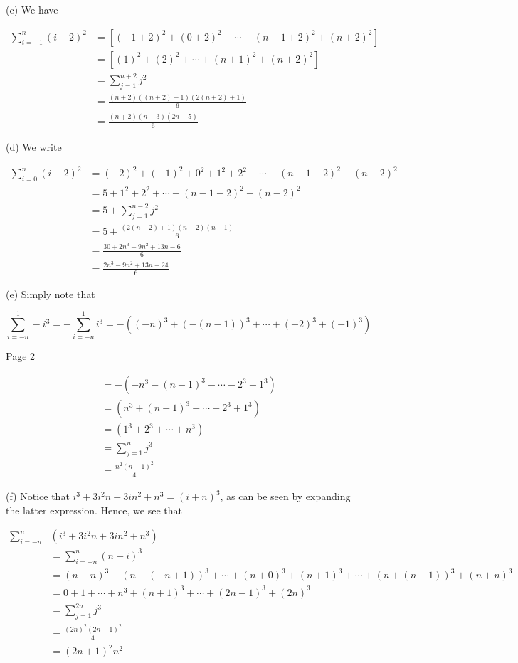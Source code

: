\documentclass[10pt]{article}
\begin{document}
(c) We have

$$
\begin{aligned}
\sum_{i=-1}^{n}(i+2)^{2} & =\left[(-1+2)^{2}+(0+2)^{2}+\cdots+(n-1+2)^{2}+(n+2)^{2}\right] \\
& =\left[(1)^{2}+(2)^{2}+\cdots+(n+1)^{2}+(n+2)^{2}\right] \\
& =\sum_{j=1}^{n+2} j^{2} \\
& =\frac{(n+2)((n+2)+1)(2(n+2)+1)}{6} \\
& =\frac{(n+2)(n+3)(2 n+5)}{6}
\end{aligned}
$$

(d) We write

$$
\begin{aligned}
\sum_{i=0}^{n}(i-2)^{2} & =(-2)^{2}+(-1)^{2}+0^{2}+1^{2}+2^{2}+\cdots+(n-1-2)^{2}+(n-2)^{2} \\
& =5+1^{2}+2^{2}+\cdots+(n-1-2)^{2}+(n-2)^{2} \\
& =5+\sum_{j=1}^{n-2} j^{2} \\
& =5+\frac{(2(n-2)+1)(n-2)(n-1)}{6} \\
& =\frac{30+2 n^{3}-9 n^{2}+13 n-6}{6} \\
& =\frac{2 n^{3}-9 n^{2}+13 n+24}{6}
\end{aligned}
$$

(e) Simply note that

$$
\sum_{i=-n}^{1}-i^{3}=-\sum_{i=-n}^{1} i^{3}=-\left((-n)^{3}+(-(n-1))^{3}+\cdots+(-2)^{3}+(-1)^{3}\right)
$$

Page 2

$$
\begin{aligned}
& =-\left(-n^{3}-(n-1)^{3}-\cdots-2^{3}-1^{3}\right) \\
& =\left(n^{3}+(n-1)^{3}+\cdots+2^{3}+1^{3}\right) \\
& =\left(1^{3}+2^{3}+\cdots+n^{3}\right) \\
& =\sum_{j=1}^{n} j^{3} \\
& =\frac{n^{2}(n+1)^{2}}{4}
\end{aligned}
$$

(f) Notice that $i^{3}+3 i^{2} n+3 i n^{2}+n^{3}=(i+n)^{3}$, as can be seen by expanding the latter expression. Hence, we see that

$$
\begin{aligned}
\sum_{i=-n}^{n} & \left(i^{3}+3 i^{2} n+3 i n^{2}+n^{3}\right) \\
& =\sum_{i=-n}^{n}(n+i)^{3} \\
& =(n-n)^{3}+(n+(-n+1))^{3}+\cdots+(n+0)^{3}+(n+1)^{3}+\cdots+(n+(n-1))^{3}+(n+n)^{3} \\
& =0+1+\cdots+n^{3}+(n+1)^{3}+\cdots+(2 n-1)^{3}+(2 n)^{3} \\
& =\sum_{j=1}^{2 n} j^{3} \\
& =\frac{(2 n)^{2}(2 n+1)^{2}}{4} \\
& =(2 n+1)^{2} n^{2}
\end{aligned}
$$
\end{document}
